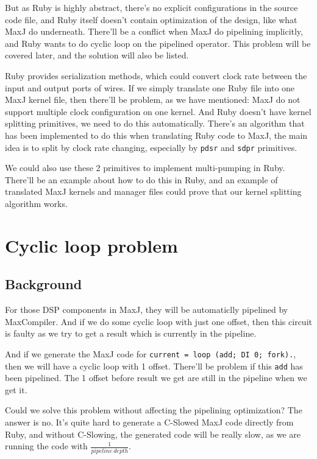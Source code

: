 \documentclass[a4paper, 10pt]{report}
\begin{document}
But as Ruby is highly abstract, there's no explicit configurations in the source code file, and Ruby itself doesn't contain optimization of the design, like what MaxJ do underneath. There'll be a conflict when MaxJ do pipelining implicitly, and Ruby wants to do cyclic loop on the pipelined operator. This problem will be covered later, and the solution will also be listed.

Ruby provides serialization methods, which could convert clock rate between the input and output ports of wires. If we simply translate one Ruby file into one MaxJ kernel file, then there'll be problem, as we have mentioned: MaxJ do not support multiple clock configuration on one kernel. And Ruby doesn't have kernel splitting primitives, we need to do this automatically. There's an algorithm that has been implemented to do this when translating Ruby code to MaxJ, the main idea is to split by clock rate changing, especially by \texttt{pdsr} and \texttt{sdpr} primitives. 

We could also use these 2 primitives to implement multi-pumping in Ruby. There'll be an example about how to do this in Ruby, and an example of translated MaxJ kernels and manager files could prove that our kernel splitting algorithm works.

\section{Cyclic loop problem}

\subsection{Background}
For those DSP components in MaxJ, they will be automaticlly pipelined by MaxCompiler. And if we do some cyclic loop with just one offset, then this circuit is faulty as we try to get a result which is currently in the pipeline.

And if we generate the MaxJ code for \lstinline{current = loop (add; DI 0; fork).}, then we will have a cyclic loop with 1 offset. There'll be problem if this \texttt{add} has been pipelined. The 1 offset before result we get are still in the pipeline when we get it.

Could we solve this problem without affecting the pipelining optimization? The answer is no. It's quite hard to generate a C-Slowed MaxJ code directly from Ruby, and without C-Slowing, the generated code will be really slow, as we are running the code with $\frac{1}{pipeline\ depth}$.
\end{document}
